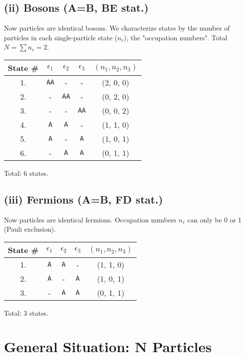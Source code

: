 \documentclass[11pt]{article}
\newcommand{\eps}{\epsilon}
\begin{document}
\subsection*{(ii) Bosons (A=B, BE stat.)}
Now particles are identical bosons. We characterize states by the number of particles in each single-particle state ($n_r$), the "occupation numbers". Total $N=\sum n_r = 2$.
\begin{center}
\begin{tabular}{ccccc}
\toprule
State \# & $\eps_1$ & $\eps_2$ & $\eps_3$ & $(n_1, n_2, n_3)$ \\
\midrule
1. & \texttt{AA} & - & - & (2, 0, 0) \\
2. & - & \texttt{AA} & - & (0, 2, 0) \\
3. & - & - & \texttt{AA} & (0, 0, 2) \\
4. & \texttt{A} & \texttt{A} & - & (1, 1, 0) \\
5. & \texttt{A} & - & \texttt{A} & (1, 0, 1) \\
6. & - & \texttt{A} & \texttt{A} & (0, 1, 1) \\
\bottomrule
\end{tabular}
\end{center}
Total: 6 states.

\subsection*{(iii) Fermions (A=B, FD stat.)}
Now particles are identical fermions. Occupation numbers $n_r$ can only be 0 or 1 (Pauli exclusion).
\begin{center}
\begin{tabular}{ccccc}
\toprule
State \# & $\eps_1$ & $\eps_2$ & $\eps_3$ & $(n_1, n_2, n_3)$ \\
\midrule
1. & \texttt{A} & \texttt{A} & - & (1, 1, 0) \\
2. & \texttt{A} & - & \texttt{A} & (1, 0, 1) \\
3. & - & \texttt{A} & \texttt{A} & (0, 1, 1) \\
\bottomrule
\end{tabular}
\end{center}
Total: 3 states.

\section*{General Situation: N Particles}
\end{document}
